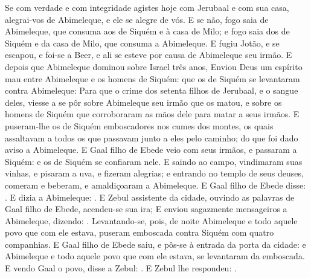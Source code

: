 {{  Se com verdade e com integridade agistes hoje com Jerubaal e com sua casa, alegrai-vos de Abimeleque, e ele se alegre de vós.
  E se não, fogo saia de Abimeleque, que consuma aos de Siquém e à casa de Milo; e fogo saia dos de Siquém e da casa de Milo, que consuma a Abimeleque}.
  E fugiu Jotão, e se escapou, e foi-se a Beer, e ali se esteve por causa de Abimeleque seu irmão.
  E depois que Abimeleque dominou sobre Israel três anos,
  Enviou Deus um espírito mau entre Abimeleque e os homens de Siquém: que os de Siquém se levantaram contra Abimeleque:
  Para que o crime dos setenta filhos de Jerubaal, e o sangue deles, viesse a se pôr sobre Abimeleque seu irmão que os matou, e sobre os homens de Siquém que corroboraram as mãos dele para matar a seus irmãos.
  E puseram-lhe os de Siquém emboscadores nos cumes dos montes, os quais assaltavam a todos os que passavam junto a eles pelo caminho; do que foi dado aviso a Abimeleque.
  E Gaal filho de Ebede veio com seus irmãos, e passaram a Siquém: e os de Siquém se confiaram nele.
  E saindo ao campo, vindimaram suas vinhas, e pisaram a uva, e fizeram alegrias; e entrando no templo de seus deuses, comeram e beberam, e amaldiçoaram a Abimeleque.
  E Gaal filho de Ebede disse: . E dizia a Abimeleque: .
  E Zebul assistente da cidade, ouvindo as palavras de Gaal filho de Ebede, acendeu-se sua ira;
  E enviou sagazmente mensageiros a Abimeleque, dizendo: .
  Levantando-se, pois, de noite Abimeleque e todo aquele povo que com ele estava, puseram emboscada contra Siquém com quatro companhias.
  E Gaal filho de Ebede saiu, e pôs-se à entrada da porta da cidade: e Abimeleque e todo aquele povo que com ele estava, se levantaram da emboscada.
  E vendo Gaal o povo, disse a Zebul: . E Zebul lhe respondeu: .
}
